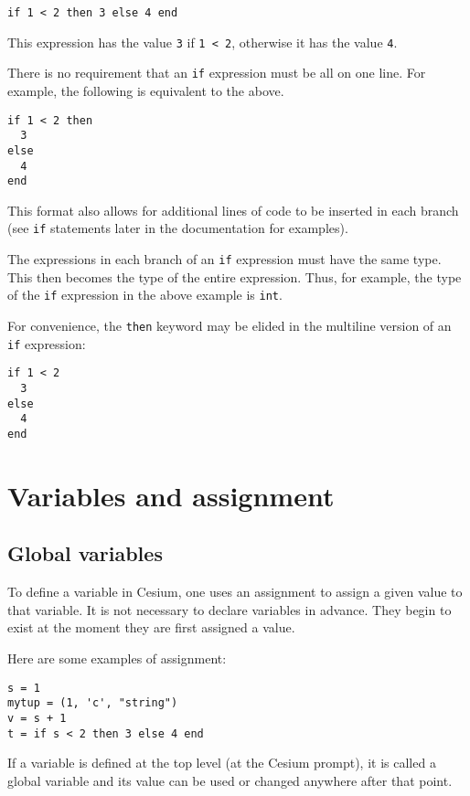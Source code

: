 \documentclass[a4paper,10pt]{article}
\newcommand{\code}{\lstinline}
\begin{document}
{\begin{lstlisting}
if 1 < 2 then 3 else 4 end
\end{lstlisting}

This expression has the value \code{3} if \code{1 < 2}, otherwise it has the value \code{4}.

There is no requirement that an \code{if} expression must be all on one line. For example,
the following is equivalent to the above.

\begin{lstlisting}
if 1 < 2 then 
  3 
else 
  4 
end
\end{lstlisting}

This format also allows for additional lines of code to be inserted in each branch (see
\code{if} statements later in the documentation for examples). 

The expressions in each branch of an \code{if} expression must have the same type. This then 
becomes the type of the entire expression. Thus, for example, the type of the \code{if} 
expression in the above example is \code{int}.

For convenience, the \code{then} keyword may be elided in the multiline version of an \code{if}
expression:

\begin{lstlisting}
if 1 < 2
  3 
else 
  4 
end
\end{lstlisting}

\section{Variables and assignment}

\subsection{Global variables}

To define a variable in Cesium, one uses an assignment to assign a given value to that variable.
It is not necessary to declare variables in advance. They begin to exist at the moment they are
first assigned a value.

Here are some examples of assignment:

\begin{lstlisting}
s = 1
mytup = (1, 'c', "string")
v = s + 1
t = if s < 2 then 3 else 4 end
\end{lstlisting}

If a variable is defined at the top level (at the Cesium prompt), it is called a global variable
and its value can be used or changed anywhere after that point.

}
\end{document}
